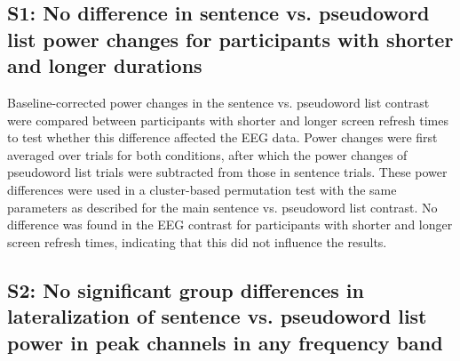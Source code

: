 \subsection{S1: No difference in sentence vs. pseudoword list power changes for participants with shorter and longer durations} \label{suppl-note}
Baseline-corrected power changes in the sentence vs. pseudoword list contrast were compared between participants with shorter and longer screen refresh times to test whether this difference affected the EEG data. Power changes were first averaged over trials for both conditions, after which the power changes of pseudoword list trials were subtracted from those in sentence trials. These power differences were used in a cluster-based permutation test with the same parameters as described for the main sentence vs. pseudoword list contrast. No difference was found in the EEG contrast for participants with shorter and longer screen refresh times, indicating that this did not influence the results.

\newpage

\subsection{S2: No significant group differences in lateralization of sentence vs. pseudoword list power in peak channels in any frequency band}
 

\clearpage
